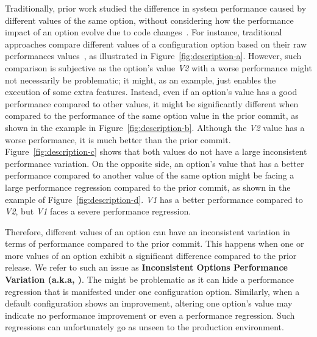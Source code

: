 \begin{figure}[t]
{	%
	}
	\label{fig:description}
\end{figure}



Traditionally, prior work studied the difference in system performance caused by different values of the same option, without considering how the performance impact of an option evolve due to code changes~\cite{tse}. For instance, traditional approaches compare different values of a configuration option based on their raw performances values~\cite{RN2880,RN3537,RN3543}, as illustrated in Figure~\ref{fig:description-a}. However, such comparison is subjective as
the option's value \emph{V2} with a worse performance might not necessarily be problematic; it might, as an example, just enables the execution of some extra features. Instead, even if an option's value has a good performance compared to other values, it might be significantly different when compared to the performance of the same option value in the prior commit, as shown in the example in Figure~\ref{fig:description-b}. Although the \emph{V2} value has a worse performance, it is much better than the prior commit. Figure~\ref{fig:description-c} shows that both values do not have a large inconsistent performance variation. On the opposite side, an option's value that has a better performance compared to another value of the same option might be facing a large performance regression compared to the prior commit, as shown in the example of Figure~\ref{fig:description-d}. \emph{V1} has a better performance compared to \emph{V2}, but \emph{V1} faces a severe performance regression. 

Therefore, different values of an option can have an inconsistent variation in terms of performance compared to the prior commit. This happens when one or more values of an option exhibit a significant difference compared to the prior release. We refer to such an issue as \textbf{Inconsistent Options Performance Variation (a.k.a, \inconsistent)}. The \inconsistent might be problematic as it can hide a performance regression that is manifested under one configuration option. Similarly, when a default configuration shows an improvement, altering one option's value may indicate no performance improvement or even a performance regression. Such regressions can unfortunately go as unseen to the production environment. 

